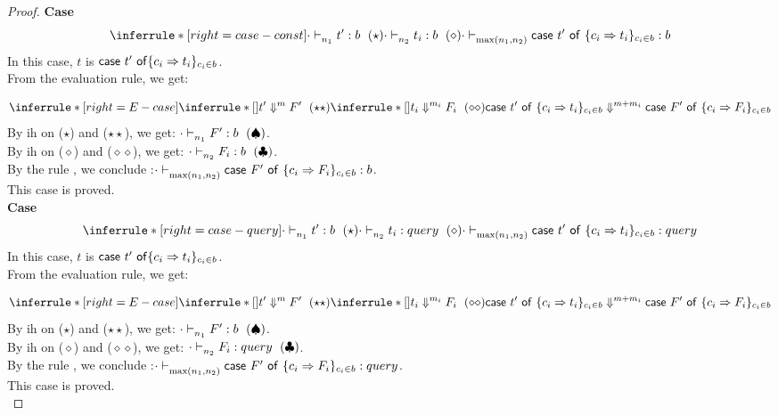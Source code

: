 \documentclass{article}
\begin{document}
\begin{proof}
\noindent \textbf{Case}
\[
 \inferrule*[ right = case-const ]
   {\cdot \jtype{n_1}{}{t'}{b}~(\star) \\ \cdot \jtype{n_2}{}{t_i}{b}~(\diamond) }
   {\cdot \jtype{\max(n_1,n_2)}{}{\tcaseof{t'}\ \{c_i \Rightarrow t_i\}_{c_i \in b} } {b} }
\]
In this case, $t$ is $ \mathsf{case}~t'~\mathsf{of} \{c_i \Rightarrow t_i\}_{c_i \in b} $.\\
From the evaluation rule, we get:

\[
\inferrule*[ right=E-case]
  { 
    \inferrule*[]
    {}
    {\eval{  t'  }{ F' }{m } ~(\star\star) }
    \\
    \inferrule*[]
    {}
    { \eval{ t_i  }{ F_i   }{ m_i } ~(\diamond\diamond)  }
  }
  { \eval{ \tcaseof{t'}\ \{c_i \Rightarrow t_i\}_{c_i \in b}  }{ \tcaseof{F'}\ \{c_i \Rightarrow F_i\}_{c_i \in b}  }{  m + m_i } }
 \] 
  By ih on ($\star$) and ($\star\star$), we get: $ \cdot \mathrel{\vdash_{n_1}^{} {F' } : {b}}~(\spadesuit) $.\\
  By ih on ($\diamond$) and ($\diamond\diamond$), we get: $ \cdot \mathrel{\vdash_{n_2}^{} {F_i} : {b}} ~(\clubsuit)$.\\
 By the rule , we conclude :$ \cdot  \mathrel{\vdash_{\max(n_1,n_2)}^{} { \mathsf{case}~F'~\mathsf{of}\ \{c_i \Rightarrow F_i\}_{c_i \in b} } : {b}}$.\\
 This case is proved.\\
 
 \noindent \textbf{Case}
 \[
    \inferrule*[ right = case-query]
   {\cdot \jtype{n_1}{}{t'}{b}~(\star) \\ \cdot \jtype{n_2}{}{t_i}{query}~(\diamond) }
   {\cdot \jtype{\max(n_1,n_2)}{}{\tcaseof{t'}\ \{c_i \Rightarrow t_i\}_{c_i \in b} } {query} }
 \]
 In this case, $t$ is $ \mathsf{case}~t'~\mathsf{of} \{c_i \Rightarrow t_i\}_{c_i \in b} $.\\
From the evaluation rule, we get:

\[
\inferrule*[ right=E-case]
  { 
    \inferrule*[]
    {}
    {\eval{  t'  }{ F' }{m } ~(\star\star) }
    \\
    \inferrule*[]
    {}
    { \eval{ t_i  }{ F_i   }{ m_i } ~(\diamond\diamond)  }
  }
  { \eval{ \tcaseof{t'}\ \{c_i \Rightarrow t_i\}_{c_i \in b}  }{ \tcaseof{F'}\ \{c_i \Rightarrow F_i\}_{c_i \in b}  }{  m + m_i } }
 \] 
  By ih on ($\star$) and ($\star\star$), we get: $ \cdot \mathrel{\vdash_{n_1}^{} {F' } : {b}}~(\spadesuit) $.\\
  By ih on ($\diamond$) and ($\diamond\diamond$), we get: $ \cdot \mathrel{\vdash_{n_2}^{} {F_i} : {query}} ~(\clubsuit)$.\\
 By the rule , we conclude :$ \cdot  \mathrel{\vdash_{\max(n_1,n_2)}^{} { \mathsf{case}~F'~\mathsf{of}\ \{c_i \Rightarrow F_i\}_{c_i \in b} } : {query}}$.\\
 This case is proved.\\
 

\end{proof}
\end{document}
